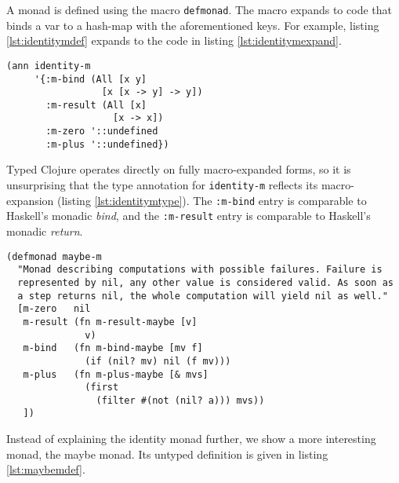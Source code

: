 A monad is defined using the macro \lstinline|defmonad|. The macro expands to code that binds a var to a hash-map
with the aforementioned keys. For example, listing \ref{lst:identitymdef} expands to 
the code in listing \ref{lst:identitymexpand}.

\begin{lstlisting}[caption=Type for identity monad, label=lst:identitymtype]
(ann identity-m
     '{:m-bind (All [x y]
                 [x [x -> y] -> y])
       :m-result (All [x]
                   [x -> x])
       :m-zero '::undefined
       :m-plus '::undefined})
\end{lstlisting}

Typed Clojure operates directly on fully macro-expanded forms, so it is unsurprising that the type
annotation for \lstinline|identity-m| reflects its macro-expansion (listing \ref{lst:identitymtype}).
The \lstinline|:m-bind| entry is comparable to Haskell's monadic \emph{bind},
and the \lstinline|:m-result| entry is comparable to Haskell's monadic \emph{return}.

\begin{lstlisting}[caption=Maybe monad definition, label=lst:maybemdef]
(defmonad maybe-m
  "Monad describing computations with possible failures. Failure is
  represented by nil, any other value is considered valid. As soon as
  a step returns nil, the whole computation will yield nil as well."
  [m-zero   nil
   m-result (fn m-result-maybe [v] 
              v)
   m-bind   (fn m-bind-maybe [mv f]
              (if (nil? mv) nil (f mv)))
   m-plus   (fn m-plus-maybe [& mvs]
              (first 
                (filter #(not (nil? a))) mvs))
   ])
\end{lstlisting}

Instead of explaining the identity monad further, we show a more interesting monad, the maybe monad.
Its untyped definition is given in listing \ref{lst:maybemdef}.

